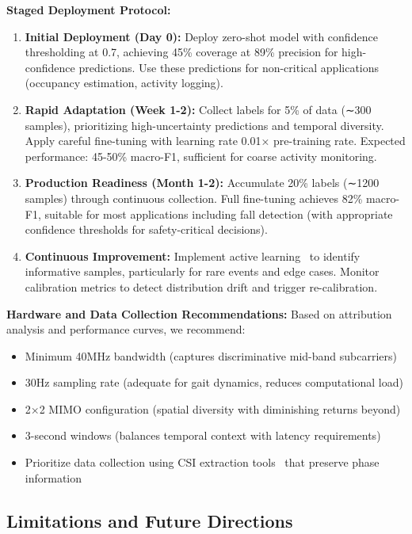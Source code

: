 \documentclass[journal]{IEEEtran}
\begin{document}
\textbf{Staged Deployment Protocol:}
\begin{enumerate}
\item \textbf{Initial Deployment (Day 0):} Deploy zero-shot model with confidence thresholding at 0.7, achieving 45\% coverage at 89\% precision for high-confidence predictions. Use these predictions for non-critical applications (occupancy estimation, activity logging).

\item \textbf{Rapid Adaptation (Week 1-2):} Collect labels for 5\% of data (∼300 samples), prioritizing high-uncertainty predictions and temporal diversity. Apply careful fine-tuning with learning rate 0.01× pre-training rate. Expected performance: 45-50\% macro-F1, sufficient for coarse activity monitoring.

\item \textbf{Production Readiness (Month 1-2):} Accumulate 20\% labels (∼1200 samples) through continuous collection. Full fine-tuning achieves 82\% macro-F1, suitable for most applications including fall detection (with appropriate confidence thresholds for safety-critical decisions).

\item \textbf{Continuous Improvement:} Implement active learning~\cite{settles2009active} to identify informative samples, particularly for rare events and edge cases. Monitor calibration metrics to detect distribution drift and trigger re-calibration.
\end{enumerate}

\textbf{Hardware and Data Collection Recommendations:}
Based on attribution analysis and performance curves, we recommend:
\begin{itemize}
\item Minimum 40MHz bandwidth (captures discriminative mid-band subcarriers)
\item 30Hz sampling rate (adequate for gait dynamics, reduces computational load)
\item 2×2 MIMO configuration (spatial diversity with diminishing returns beyond)
\item 3-second windows (balances temporal context with latency requirements)
\item Prioritize data collection using CSI extraction tools~\cite{csi_tool2011} that preserve phase information
\end{itemize}

\subsection{Limitations and Future Directions}
\end{document}
